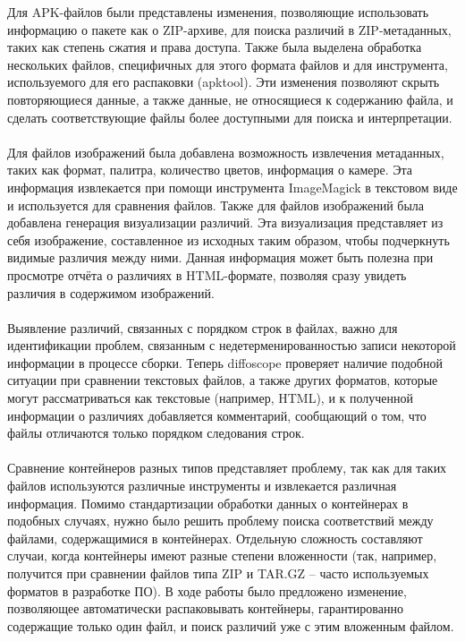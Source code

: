 Для APK-файлов были представлены изменения, позволяющие использовать информацию о пакете как о ZIP-архиве, для поиска различий в ZIP-метаданных, таких как степень сжатия и права доступа. Также была выделена обработка нескольких файлов, специфичных для этого формата файлов и для инструмента, используемого для его распаковки (apktool). Эти изменения позволяют скрыть повторяющиеся данные, а также данные, не относящиеся к содержанию файла, и сделать соответствующие файлы более доступными для поиска и интерпретации.\\\\
Для файлов изображений была добавлена возможность извлечения метаданных, таких как формат, палитра, количество цветов, информация о камере. Эта информация извлекается при помощи инструмента ImageMagick в текстовом виде и используется для сравнения файлов. Также для файлов изображений была добавлена генерация визуализации различий. Эта визуализация представляет из себя изображение, составленное из исходных таким образом, чтобы подчеркнуть видимые различия между ними. Данная информация может быть полезна при просмотре отчёта о различиях в HTML-формате, позволяя сразу увидеть различия в содержимом изображений.\\\\
Выявление различий, связанных с порядком строк в файлах, важно для идентификации проблем, связанным с недетерменированностью записи некоторой информации в процессе сборки. Теперь diffoscope проверяет наличие подобной ситуации при сравнении текстовых файлов, а также других форматов, которые могут рассматриваться как текстовые (например, HTML), и к полученной информации о различиях добавляется комментарий, сообщающий о том, что файлы отличаются только порядком следования строк.\\\\
Сравнение контейнеров разных типов представляет проблему, так как для таких файлов используются различные инструменты и извлекается различная информация. Помимо стандартизации обработки данных о контейнерах в подобных случаях, нужно было решить проблему поиска соответствий между файлами, содержащимися в контейнерах. Отдельную сложность составляют случаи, когда контейнеры имеют разные степени вложенности (так, например, получится при сравнении файлов типа ZIP и TAR.GZ -- часто используемых форматов в разработке ПО). В ходе работы было предложено изменение, позволяющее автоматически распаковывать контейнеры, гарантированно содержащие только один файл, и поиск различий уже с этим вложенным файлом.\\\\
